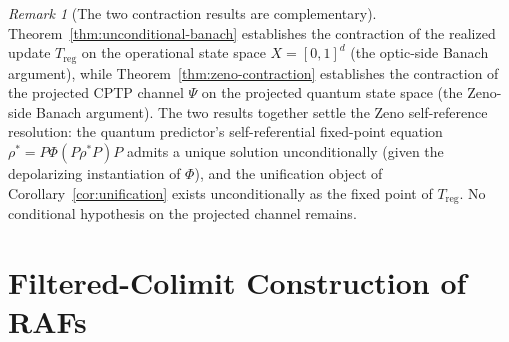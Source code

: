 \documentclass[11pt,a4paper]{article}
\theoremstyle{plain}
\theoremstyle{definition}
\theoremstyle{remark}
\newtheorem{remark}[theorem]{Remark}
\begin{document}
\begin{remark}[The two contraction results are complementary]
\label{rem:two-contractions}
Theorem~\ref{thm:unconditional-banach} establishes the contraction of
the realized update $T_{\mathrm{reg}}$ on the operational state space
$X=[0,1]^{d}$ (the optic-side Banach argument), while
Theorem~\ref{thm:zeno-contraction} establishes the contraction of the
projected CPTP channel $\Psi$ on the projected quantum state space
(the Zeno-side Banach argument). The two results together settle
the Zeno self-reference resolution: the quantum predictor's
self-referential fixed-point equation $\rho^{*}=P\Phi(P\rho^{*}P)P$
admits a unique solution unconditionally (given the depolarizing
instantiation of $\Phi$), and the unification object of
Corollary~\ref{cor:unification} exists unconditionally as the fixed
point of $T_{\mathrm{reg}}$. No conditional hypothesis on the
projected channel remains.
\end{remark}


\section{Filtered-Colimit Construction of RAFs}\label{sec:invlim}
\end{document}

